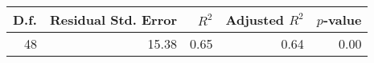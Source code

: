 \begin{tabular}{rrrrr}
  \hline
D.f. & Residual Std. Error & $R^2$ & Adjusted $R^2$ & $p$-value \\ 
  \hline
 48 & 15.38 & 0.65 & 0.64 & 0.00 \\ 
   \hline
\end{tabular}
